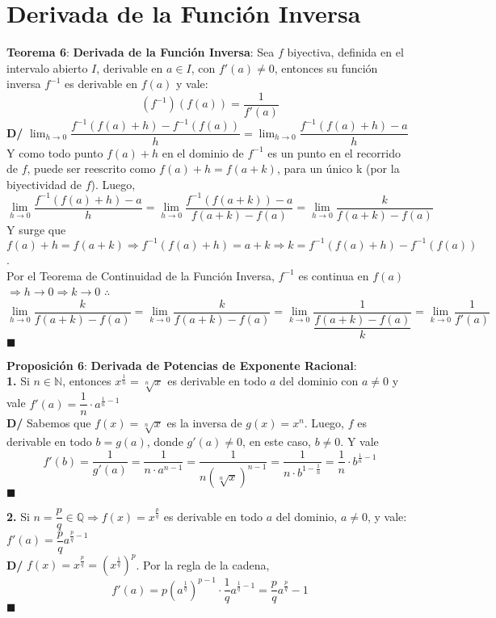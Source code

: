 \documentclass[11pt,a4paper]{article}
\newcommand*{\QEDA}{\null\nobreak\hfill\ensuremath{\blacksquare}}
\begin{document}
\section{Derivada de la Funci\'on Inversa}
\textbf{Teorema 6}: \textbf{Derivada de la Funci\'on Inversa}: Sea $f$ biyectiva, definida en el intervalo abierto $I$, derivable en $a \in I$, con $f'(a)\not=0$, entonces su funci\'on inversa $f^{-1}$ es derivable en $f(a)$ y vale: $$(f^{-1})(f(a)) = \dfrac{1}{f'(a)}$$
\textbf{D/} 
$\displaystyle{\lim_{h \to 0} \dfrac{f^{-1}(f(a)+h) - f^{-1}(f(a))}{h}}
= \displaystyle{\lim_{h \to 0} \dfrac{f^{-1}(f(a)+h) - a}{h}}$\\
Y como todo punto $f(a)+h$ en el dominio de $f^{-1}$ es un punto en el recorrido de $f$, puede ser reescrito como $f(a)+h = f(a+k)$, para un \'unico k (por la biyectividad de $f$). Luego, \\
$$\displaystyle{\lim_{h \to 0} \dfrac{f^{-1}(f(a)+h) - a}{h}} =
 \displaystyle{\lim_{h \to 0} \dfrac{f^{-1}(f(a+k)) - a}{f(a+k)-f(a)}} =
 \displaystyle{\lim_{h \to 0} \dfrac{k}{f(a+k)-f(a)}}$$
Y surge que $f(a)+h = f(a+k) \Rightarrow f^{-1}(f(a)+h)=a+k \Rightarrow k = f^{-1}(f(a)+h) - f^{-1}(f(a))$. \\
Por el Teorema de Continuidad de la Funci\'on Inversa, $f^{-1}$ es continua en $f(a)$ $\Rightarrow h \rightarrow 0 \Rightarrow k \rightarrow 0$ $\therefore$
$$\displaystyle{\lim_{h \to 0} \dfrac{k}{f(a+k)-f(a)}} = \displaystyle{\lim_{k \to 0} \dfrac{k}{f(a+k)-f(a)}} = \displaystyle{\lim_{k \to 0} \dfrac{1}{\dfrac{f(a+k)-f(a)}{k}}} = \displaystyle{\lim_{k \to 0} \dfrac{1}{f'(a)}}$$ \QEDA\\

\newpage

\noindent \textbf{Proposici\'on 6}: \textbf{Derivada de Potencias de Exponente Racional}:\\
\textbf{1.} Si $n \in \mathbb{N}$, entonces $x^{\frac{1}{n}} = \sqrt[n]{x}$ es derivable en todo $a$ del dominio con $a\not=0$ y vale $f'(a) = \dfrac{1}{n} \cdot a^{\frac{1}{n}-1}$\\
\textbf{D/} Sabemos que $f(x)=\sqrt[n]{x}$ es la inversa de $g(x)=x^n$. Luego, $f$ es derivable en todo $b = g(a)$, donde $g'(a)\not=0$, en este caso, $b\not=0$. Y vale $$f'(b)=\dfrac{1}{g'(a)} = \dfrac{1}{n\cdot a^{n-1}} = \dfrac{1}{n(\sqrt[n]{x})^{n-1}} = \dfrac{1}{n\cdot b^{1-\frac{1}{n}}} = \dfrac{1}{n}\cdot b^{\frac{1}{n}-1}$$ \QEDA

\noindent \textbf{2.} Si $n=\dfrac{p}{q} \in \mathbb{Q} \Rightarrow f(x)=x^{\frac{p}{q}}$ es derivable en todo $a$ del dominio, $a\not=0$, y vale: $f'(a) = \dfrac{p}{q}a^{\frac{p}{q}-1}$\\
\textbf{D/} $f(x)=x^\frac{p}{q}=(x^\frac{1}{q})^p$. Por la regla de la cadena, $$f'(a) = p(a^\frac{1}{q})^{p-1} \cdot \dfrac{1}{q}a^{\frac{1}{q}-1} = \dfrac{p}{q}a^\frac{p}{q}-1$$ \QEDA
\end{document}
